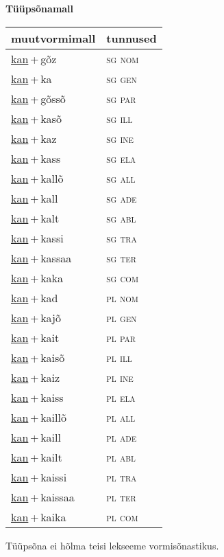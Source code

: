 
\vspace{1.8em}
\begin{minipage}{\textwidth}
\textbf{Tüüpsõnamall \,}\\

\begin{sideways}
\begin{tabular}{l l}
muutvormimall & tunnused \\
\hline
\underline{kan}\,+\,gõz & \textsc{ sg nom } \\
\underline{kan}\,+\,ka & \textsc{ sg gen } \\
\underline{kan}\,+\,gõssõ & \textsc{ sg par } \\
\underline{kan}\,+\,kasõ & \textsc{ sg ill } \\
\underline{kan}\,+\,kaz & \textsc{ sg ine } \\
\underline{kan}\,+\,kass & \textsc{ sg ela } \\
\underline{kan}\,+\,kallõ & \textsc{ sg all } \\
\underline{kan}\,+\,kall & \textsc{ sg ade } \\
\underline{kan}\,+\,kalt & \textsc{ sg abl } \\
\underline{kan}\,+\,kassi & \textsc{ sg tra } \\
\underline{kan}\,+\,kassaa & \textsc{ sg ter } \\
\underline{kan}\,+\,kaka & \textsc{ sg com } \\
\underline{kan}\,+\,kad & \textsc{ pl nom } \\
\underline{kan}\,+\,kajõ & \textsc{ pl gen } \\
\underline{kan}\,+\,kait & \textsc{ pl par } \\
\underline{kan}\,+\,kaisõ & \textsc{ pl ill } \\
\underline{kan}\,+\,kaiz & \textsc{ pl ine } \\
\underline{kan}\,+\,kaiss & \textsc{ pl ela } \\
\underline{kan}\,+\,kaillõ & \textsc{ pl all } \\
\underline{kan}\,+\,kaill & \textsc{ pl ade } \\
\underline{kan}\,+\,kailt & \textsc{ pl abl } \\
\underline{kan}\,+\,kaissi & \textsc{ pl tra } \\
\underline{kan}\,+\,kaissaa & \textsc{ pl ter } \\
\underline{kan}\,+\,kaika & \textsc{ pl com } \\
\end{tabular}
\end{sideways}
\label{tab:tüüpsõnamall-kangõz}

\end{minipage}

 
\vspace{1em}
\noindent Tüüpsõna ei hõlma teisi lekseeme vormi\-sõnastikus.
